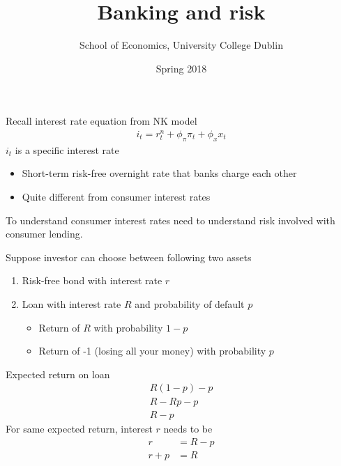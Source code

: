 \documentclass{beamer}
\title{Banking and risk}
\author{School of Economics, University College Dublin}
\date{Spring 2018}
\begin{document}
\begin{frame}
 \titlepage
\end{frame}

\begin{frame}
 Recall interest rate equation from NK model
  \begin{align} 
  i_t=r_t^n+ \phi_{\pi}\pi_t+\phi_xx_t 
\end{align}
\medskip
$i_t$ is a specific interest rate
\begin{itemize}
  \item Short-term risk-free overnight rate that banks charge each other
  \item Quite different from consumer interest rates
\end{itemize}
\medskip
To understand consumer interest rates need to understand risk involved with consumer lending. 
\end{frame}

\begin{frame}
 Suppose investor can choose between following two assets  
\begin{enumerate}
  \item Risk-free bond with interest rate $r$
  \item Loan with interest rate $R$ and probability of default $p$
  \begin{itemize}
    \item Return of $R$ with probability $1-p$
    \item Return of -1 (losing all your money) with probability $p$
  \end{itemize}
\end{enumerate}
\end{frame}

\begin{frame}
  Expected return on loan
  \begin{align}
   R(1-p)-p\\ \nonumber
    R-Rp-p\\ \nonumber
    R-p
\end{align}
 For same expected return, interest $r$ needs to be 
\begin{align}
  r &= R-p\\ \nonumber
  r+p &=R
\end{align}
\end{frame}
\end{document}

